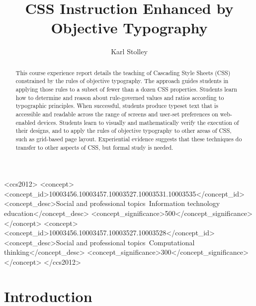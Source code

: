 \documentclass[sigplan,screen]{acmart}
\begin{document}
\title[CSS Instruction Enhanced by Objective Typography]{CSS Instruction Enhanced by Objective Typography}

\author{Karl Stolley}

\begin{abstract}
This course experience report details the teaching of Cascading Style Sheets (CSS) constrained by the rules of objective typography. The approach guides students in applying those rules to a subset of fewer than a dozen CSS properties. Students learn how to determine and reason about rule-governed values and ratios according to typographic principles. When successful, students produce typeset text that is accessible and readable across the range of screens and user-set preferences on web-enabled devices. Students learn to visually and mathematically verify the execution of their designs, and to apply the rules of objective typography to other areas of CSS, such as grid-based page layout. Experiential evidence suggests that these techniques do transfer to other aspects of CSS, but formal study is needed.
\end{abstract}

\begin{CCSXML}
<ccs2012>
<concept>
  <concept_id>10003456.10003457.10003527.10003531.10003535</concept_id>
  <concept_desc>Social and professional topics~Information technology education</concept_desc>
  <concept_significance>500</concept_significance>
</concept>
<concept>
  <concept_id>10003456.10003457.10003527.10003528</concept_id>
  <concept_desc>Social and professional topics~Computational thinking</concept_desc>
  <concept_significance>300</concept_significance>
</concept>
</ccs2012>
\end{CCSXML}




\maketitle

\section{Introduction}
\end{document}
